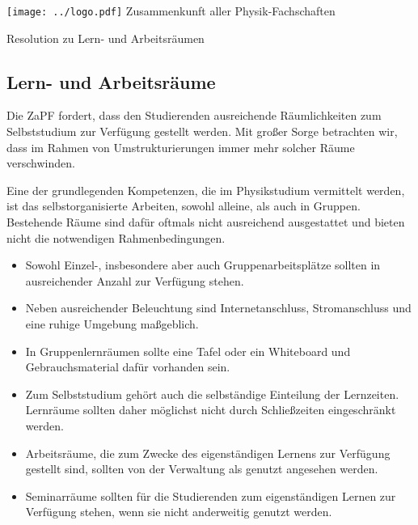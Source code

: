 \documentclass[a4paper]{scrartcl}
\begin{document}
    \hspace{0.87\textwidth}
    \begin{minipage}{120pt}
        \vspace{-1.8cm}
        \texttt{[image: ../logo.pdf]}
        \centering
        \small Zusammenkunft aller Physik-Fachschaften
    \end{minipage}
    \begin{center}
        \huge{Resolution zu Lern- und Arbeitsräumen}\vspace{.25\baselineskip}\\
        \normalsize
    \end{center}
    \vspace{0.5cm}

\subsection*{Lern- und Arbeitsräume}

Die ZaPF fordert, dass den Studierenden ausreichende Räumlichkeiten zum Selbststudium zur Verfügung gestellt werden. Mit großer Sorge betrachten wir, dass im Rahmen von Umstrukturierungen immer mehr solcher Räume verschwinden.


Eine der grundlegenden Kompetenzen, die im Physikstudium vermittelt werden, ist das selbstorganisierte Arbeiten, sowohl alleine, als auch in Gruppen. Bestehende Räume sind dafür oftmals nicht ausreichend ausgestattet und bieten nicht die notwendigen Rahmenbedingungen.

\begin{itemize}
	\item Sowohl Einzel-, insbesondere aber auch Gruppenarbeitsplätze sollten in ausreichender Anzahl zur Verfügung stehen.
	\item Neben ausreichender Beleuchtung sind Internetanschluss, Stromanschluss und eine ruhige Umgebung maßgeblich.
	\item In Gruppenlernräumen sollte eine Tafel oder ein Whiteboard und Gebrauchsmaterial dafür vorhanden sein.
	\item Zum Selbststudium gehört auch die selbständige Einteilung der Lernzeiten. Lern\-räume sollten daher möglichst nicht durch Schließzeiten eingeschränkt werden.
	\item Arbeitsräume, die zum Zwecke des eigenständigen Lernens zur Verfügung gestellt sind, sollten von der Verwaltung als genutzt angesehen werden.
	\item Seminarräume sollten für die Studierenden zum eigenständigen Lernen zur Ver\-fügung stehen, wenn sie nicht anderweitig genutzt werden.
\end{itemize}
\end{document}
